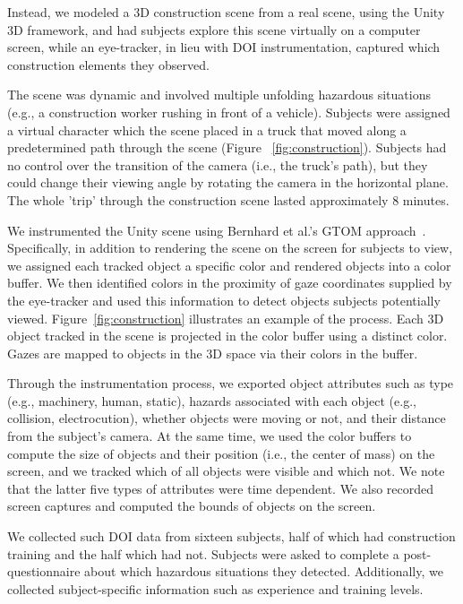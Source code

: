 Instead, we modeled a 3D construction scene from a real scene, using the Unity 3D framework, and had subjects explore this scene virtually on a computer screen, while an eye-tracker, in lieu with DOI instrumentation, captured which construction elements they observed. 

The scene was dynamic and involved multiple unfolding hazardous situations (e.g., a construction worker rushing in front of a vehicle). Subjects were assigned a virtual character which the scene placed in a truck that moved along a predetermined path through the scene (Figure ~\ref{fig:construction}). Subjects had no control over the transition of the camera (i.e., the truck's path), but they could change their viewing angle by rotating the camera in the horizontal plane. The whole 'trip' through the construction scene lasted approximately $8$ minutes. 

We instrumented the Unity scene using Bernhard et al.'s GTOM approach~\cite{Bern14}. Specifically, in addition to rendering the scene on the screen for subjects to view, we assigned each tracked object a specific color and rendered objects into a color buffer. We then identified colors in the proximity of gaze coordinates supplied by the eye-tracker and used this information to detect objects subjects potentially viewed. Figure~\ref{fig:construction} illustrates an example of the process. Each 3D object tracked in the scene is projected in the color buffer using a distinct color. Gazes are mapped to objects in the 3D space via their colors in the buffer.

Through the instrumentation process, we exported object attributes such as type (e.g., machinery, human, static), hazards associated with each object (e.g., collision, electrocution), whether objects were moving or not,  and their distance from the subject's camera. At the same time, we used the color buffers to compute the size of objects and their position (i.e., the center of mass) on the screen, and we tracked which of all objects were visible and which not. We note that the latter five types of attributes were time dependent. We also recorded screen captures and computed the bounds of objects on the screen. 

We collected such DOI data from sixteen subjects, half of which had construction training and the half which had not. Subjects were asked to complete a post-questionnaire about which hazardous situations they detected. Additionally, we collected subject-specific information such as experience and training levels. 

